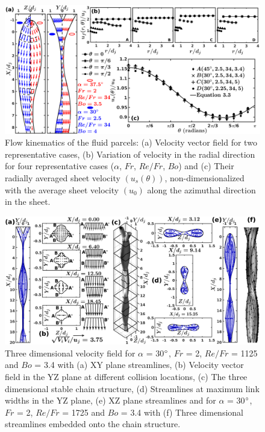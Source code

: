 \documentclass{jfm}
\begin{document}
\begin{figure}
	\centering
	\includegraphics[width=\linewidth]{Figure4}
	\caption{Flow kinematics of the fluid parcels: (a) Velocity vector field for two representative cases, (b) Variation of velocity in the radial direction for four representative cases ($\alpha$, $Fr$, $Re/Fr$, $Bo$) and (c) Their radially averaged sheet velocity $\left(u_s(\theta)\right)$, non-dimensionalized with the average sheet velocity $\left(u_0\right)$ along the azimuthal direction in the sheet.}
	\label{Figure::velocityVectors}%
\end{figure}
\begin{figure}
	\centering
	\includegraphics[width=\linewidth]{Figure5}
	\caption{Three dimensional velocity field for $\alpha$ = 30$\degree$, $Fr$ = 2,  $Re/Fr$ = 1125 and $Bo$ = 3.4 with (a) XY plane streamlines, (b) Velocity vector field in the YZ plane at different collision locations, (c) The three dimensional stable chain structure, (d) Streamlines at maximum link widths in the YZ plane, (e) XZ plane streamlines and for $\alpha$ = 30$\degree$, $Fr$ = 2,  $Re/Fr$ = 1725 and $Bo$ = 3.4 with (f) Three dimensional streamlines embedded onto the chain structure.}
	\label{Figure::streamDetails}%
\end{figure}
\end{document}
